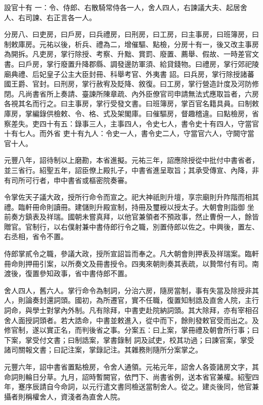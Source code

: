 \begin{pinyinscope}
 設官十有
 一：令、侍郎、右散騎常侍各一人，舍人四人，右諫議大夫、起居舍人、右司諫、右正言各一人。



 分房八、曰吏房，曰戶房，曰兵禮房，曰刑房，曰工房，曰主事房，曰班簿房，曰制敕庫房。元祐以後，析兵、禮為二，增催驅、點檢，分房十有一，後又改主事房為開拆。凡吏房，掌行除授、考察、升黜、賞罰、廢置、薦舉、假故、一時差官文書。曰戶房，掌行廢置升降郡縣、調發邊防軍須、給貸錢物。曰禮房，掌行郊祀陵廟典禮、后妃皇子公主大臣封冊、科舉考官、外夷書
 詔。曰兵房，掌行除授諸蕃國王爵、官封。曰刑房，掌行赦宥及貶降、敘復。曰工房，掌行營造計度及河防修閉。凡尚書省所上奏請、臺諫所陳章疏、內外臣僚官司申請無法式應取旨者，六房各視其名而行之。曰主事房，掌行受發文書。曰班簿房，掌百官名籍具員。曰制敕庫房，掌編錄供檢敕、令、格、式及架閣庫。曰催驅房，督趣稽違。曰點檢房，省察差失。吏四十有五：錄事三人，主事四人，令史七人，書令史十有四人，守當官十有七人。而外省
 吏十有九人：令史一人，書令史二人，守當官六人，守闕守當官十人。



 元豐八年，詔待制以上磨勘，本省進擬。元祐三年，詔應除授從中批付中書省者，並三省行。紹聖五年，詔臣僚上殿扎子，中書省進呈取旨；其承受傳宣、內降，非有司所可行者，申中書省或樞密院奏審。



 令掌佐天子議大政，授所行命令而宣之。祀大神祇則升壇，享宗廟則升阼階而相其禮。臨軒冊命則讀冊。建儲則升殿宣制，持冊及璽綬以授太子。大朝會則詣御
 坐前奏方鎮表及祥瑞。國朝未嘗真拜，以他官兼領者不預政事，然止曹佾一人，餘皆贈官。官制行，以右僕射兼中書侍郎行令之職，別置侍郎以佐之。中興後，置左、右丞相，省令不置。



 侍郎掌貳令之職，參議大政，授所宣詔旨而奉之。凡大朝會則押表及祥瑞案。臨軒冊命則押冊引案，以所奏文及冊書授令。四夷來朝則奏其表疏，以贄幣付有司。南渡後，復置參知政事，省中書侍郎不置。



 舍人四人，舊六人。掌行命令為制詞，分治六房，隨房當制，事有失當及除授非其人，則論奏封還詞頭。國初，為所遷官，實不任職，復置知制誥及直舍人院，主行詞命，與學士對掌內外制。凡有除拜，中書吏赴院納詞頭。其大除拜，亦有宰相召舍人面授詞頭者。若大誥命，中書並敕進入，從中而下，餘則發敕官受而出之。及修官制，遂以實正名，而判後省之事。分案五：曰上案，掌冊禮及朝會所行事；曰下案，掌受付文書；曰制誥案，掌書錄制
 詞及試吏，校其功過；曰諫官案，掌受諸司關報文書；曰記注案，掌錄記注。其雜務則隨所分案掌之。



 元豐六年，詔中書省置點檢房，令舍人通領。元祐元年，詔舍人各簽諸房文字，其命詞則輪日分草。九月，詔時暫闕官，依門下、尚書省例，送本省官兼權。紹聖四年，蹇序辰請自今命詞，以元行遣文書同檢送當制舍人。從之。建炎後同，他官兼攝者則稱權舍人，資淺者為直舍人院。




\end{pinyinscope}
